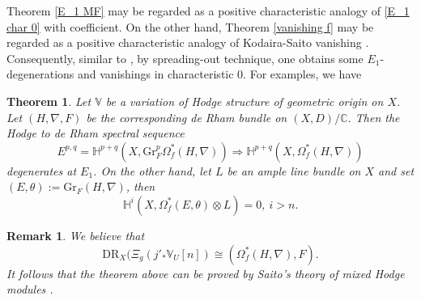 \documentclass[12pt, a4paper]{article}
\newtheorem{theorem}{Theorem}[section]
\newtheorem{remark}{Remark}[section]
\begin{document}
 Theorem \ref{E_1 MF} may be regarded as a positive characteristic analogy of \eqref{E_1 char 0} with coefficient. On the other hand, Theorem \ref{vanishing f} may be regarded as a positive characteristic analogy of Kodaira-Saito vanishing \cite[Proposition 2.33]{Saito}.
 Consequently, similar to \cite[\S5]{SZ1}, by spreading-out technique, one obtains some $E_1$-degenerations and vanishings in characteristic $0$. For examples, we have
\begin{theorem}
 Let $\mathbb V$ be a variation of Hodge structure of geometric origin on $X$. Let $(H,\nabla,F)$ be the corresponding de Rham bundle on $(X,D)/\mathbb C$. Then the Hodge to de Rham spectral sequence
$$
E^{p,q}=\mathbb H^{p+q}(X,\mathrm{Gr}^p_F\Omega_f^*(H,\nabla))\Rightarrow\mathbb H^{p+q}(X,\Omega_f^*(H,\nabla))
$$
degenerates at $E_1$.  On the other hand, let $L$ be an ample line bundle on $X$ and set $(E,\theta):=\mathrm{Gr}_F(H,\nabla)$, then
$$
\mathbb H^i(X,\Omega_f^*(E,\theta)\otimes L)=0,~i>n.
$$
\end{theorem}
\begin{remark}
We believe that 
$$\mathrm{DR}_X(\Xi_g(j'_*\mathbb V_U[n])\cong(\Omega_f^*(H,\nabla),F).$$
 It follows that the theorem above can be proved by Saito's theory of mixed Hodge modules \cite{Saito}.
\end{remark}
\end{document}
